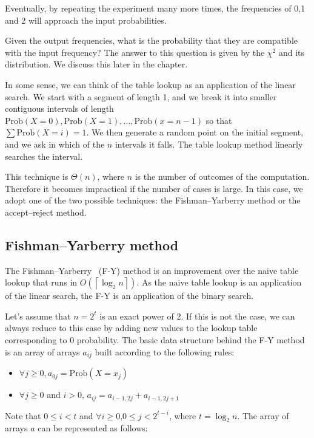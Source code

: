 \documentclass[justified,sixbynine]{tufte-book}
\theoremstyle{plain}%
\theoremstyle{definition}
\theoremstyle{remark}
\begin{document}
\begin{fullwidth}
Eventually, by repeating the experiment many more times, the frequencies of
0,1 and 2 will approach the input probabilities.

Given the output frequencies, what is the probability that they are compatible with the input frequency?
The answer to this question is given by the $\chi^2$ and its distribution. We discuss this later in the chapter.

In some sense, we can think of the table lookup as an application of the
linear search. We start with a segment of length 1, and we break it into smaller
contiguous intervals of length $\textrm{Prob}(X=0),\textrm{Prob}(X=1),\dots,\textrm{Prob}(x=n-1)$ so that $\sum
\textrm{Prob}(X=i)=1.$ We then generate a random point on the initial segment, and we ask
in which of the $n$ intervals it falls. The table lookup method linearly
searches the interval.

This technique is $\Theta (n)$, where $n$ is the number of outcomes of the
computation. Therefore it becomes impractical if the number of cases is
large. In this case, we adopt one of the two possible techniques: the
Fishman--Yarberry method or the accept--reject method.

\goodbreak\subsection{Fishman--Yarberry method}

The Fishman--Yarberry~\cite{fishman}  (F-Y) method is an improvement over the naive table
lookup that runs in $O(\left\lceil \log _2n\right\rceil )$. As the naive
table lookup is an application of the linear search, the F-Y is an
application of the binary search.

Let's assume that $n=2^t$ is an exact power of $2$. If this is not the case,
we can always reduce to this case by adding new values to the lookup table
corresponding to $0$ probability. The basic data structure behind the F-Y
method is an array of arrays $a_{ij}$ built according to the following rules:

\begin{itemize}
\item  $\forall j\geq 0,a_{0j}=\textrm{Prob}(X=x_j)$

\item  $\forall j\geq 0$ and $i>0$, $a_{ij}=a_{i-1,2j}+a_{i-1,2j+1}$
\end{itemize}

Note that $0\leq i<t$ and $\forall i\geq 0$,$0\leq j<2^{t-i}$, where $t=\log
_2n$. The array of arrays $a$ can be represented as follows:


\end{fullwidth}
\end{document}
